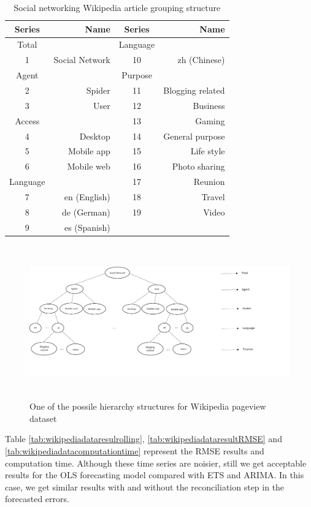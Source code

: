 \documentclass[11pt,a4paper,]{article}
\begin{document}
\begin{table}

\caption{\label{tab:wikipediagroupingstructure}Social networking Wikipedia article grouping structure}
\centering
\begin{tabular}[t]{crcr}
\toprule
Series & Name & Series & Name\\
\midrule
Total &  & Language & \\
1 & Social Network & 10 & zh (Chinese)\\
Agent &  & Purpose & \\
2 & Spider & 11 & Blogging related\\
3 & User & 12 & Business\\
Access &  & 13 & Gaming\\
4 & Desktop & 14 & General purpose\\
5 & Mobile app & 15 & Life style\\
6 & Mobile web & 16 & Photo sharing\\
Language &  & 17 & Reunion\\
7 & en (English) & 18 & Travel\\
8 & de (German) & 19 & Video\\
9 & es (Spanish) &  & \\
\bottomrule
\end{tabular}
\end{table}

\begin{figure}

{\centering \includegraphics[width=500px,height=250px]{Paper-Figures/Wiki_group_structure} 

}

\caption{One of the possile hierarchy structures for Wikipedia pageview dataset}\label{fig:wikigroupstructure}
\end{figure}

Table \ref{tab:wikipediadataresulrolling},
\ref{tab:wikipediadataresultRMSE} and
\ref{tab:wikipediadatacomputationtime} represent the RMSE results and
computation time. Although these time series are noisier, still we get
acceptable results for the OLS forecasting model compared with ETS and
ARIMA. In this case, we get similar results with and without the
reconciliation step in the forecasted errors.
\end{document}
